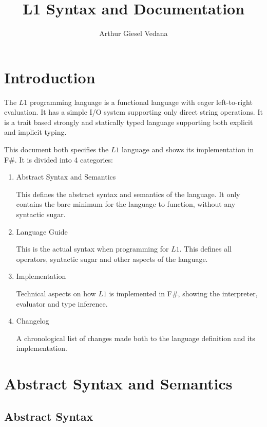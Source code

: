 \documentclass{article}
\author{Arthur Giesel Vedana}
\title{L1 Syntax and Documentation}
\begin{document}
\maketitle
{}
\newpage

\tableofcontents
\newpage

\section*{Introduction}
The $L1$ programming language is a functional language with eager left-to-right evaluation.
It has a simple I/O system supporting only direct string operations.
It is a trait based strongly and statically typed language supporting both explicit and implicit typing.


This document both specifies the $L1$ language and shows its implementation in F\#.
It is divided into 4 categories:
\begin{enumerate}
    \item Abstract Syntax and Semantics

        This defines the abstract syntax and semantics of the language.
        It only contains the bare minimum for the language to function, without any syntactic sugar.
    \item Language Guide

        This is the actual syntax when programming for $L1$.
        This defines all operators, syntactic sugar and other aspects of the language.
    \item Implementation

        Technical aspects on how $L1$ is implemented in F\#, showing the interpreter, evaluator and type inference.
    \item Changelog

        A chronological list of changes made both to the language definition and its implementation.
\end{enumerate}

\newpage
{}
\section{Abstract Syntax and Semantics}

\subsection{Abstract Syntax}
\end{document}
